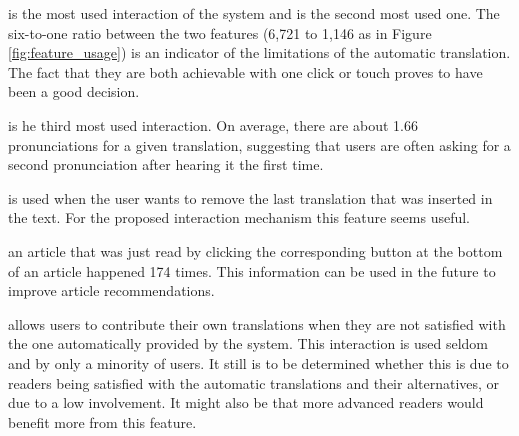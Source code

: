  is the most used interaction of the system and  is the second most used one. The six-to-one ratio between the two features (6,721 to 1,146 as in Figure \ref{fig:feature_usage}) is an indicator of the limitations of the automatic translation. The fact that they are both achievable with one click or touch proves to have been a good decision. 

 is he third most used interaction. On average, there are about 1.66 pronunciations for a given translation, suggesting that users are often asking for a second pronunciation after hearing it the first time. 




 is used when the user wants to remove the last translation that was inserted in the text. For the proposed interaction mechanism this feature seems useful. 

 an article that was just read by clicking the corresponding button at the bottom of an article happened 174 times. This information can be used in the future to improve article recommendations.

 allows users to contribute their own translations when they are not satisfied with the one automatically provided by the system. This interaction is used seldom and by only a minority of users. It still is to be determined whether this is due to readers being satisfied with the automatic translations and their alternatives, or due to a low involvement. It might also be that more advanced readers would benefit more from this feature.

